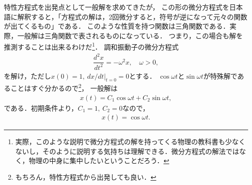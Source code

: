 特性方程式を出発点として一般解を求めてきたが，
この形の微分方程式を日本語に解釈すると，「方程式の解は，2回微分すると，符号が逆になって元々の関数が出てくるもの」である．
このような性質を持つ関数は三角関数である．実際，一般解は三角関数で表されるものになっている．
つまり，この場合も解を推測することは出来るわけだ\footnote{実際，このような説明で微分方程式の解を持ってくる物理の教科書も少なくないし，そのように説明する気持ちは理解できる．微分方程式の解法ではなく，物理の中身に集中したいということだろう．}．
%
\newpage
%
\gl
\reidai
調和振動子の微分方程式
\begin{align}
 \dfrac{d^2x}{dt^2} = -\omega^2 x, \quad \omega > 0, 
\end{align}
を解け，ただし$x(0)=1,~dx/dt|_{t=0}=0$とする．
\gl
%
$\cos\omega t$と$\sin\omega t$が特殊解であることはすぐ分かるので\footnote{もちろん，特性方程式から出発しても良い．}，
一般解は
\begin{align}
 x(t) = C_1 \cos \omega t + C_2 \sin \omega t, 
\end{align}
である．初期条件より，$C_1=1,~C_2=0$なので，
\begin{align}
 x(t) = \cos \omega t. 
\end{align}

\newpage
%

%
